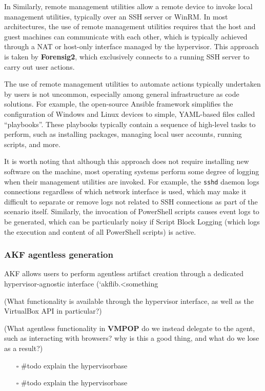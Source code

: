 In Similarly, remote management utilities allow a remote device to
invoke local management utilities, typically over an SSH server or
WinRM. In most architectures, the use of remote management utilities
requires that the host and guest machines can communicate with each
other, which is typically achieved through a NAT or host-only interface
managed by the hypervisor. This approach is taken by \textbf{Forensig2},
which exclusively connects to a running SSH server to carry out user
actions.

The use of remote management utilities to automate actions typically
undertaken by users is not uncommon, especially among general
infrastructure as code solutions. For example, the open-source Ansible
framework simplifies the configuration of Windows and Linux devices to
simple, YAML-based files called ``playbooks''. These playbooks typically
contain a sequence of high-level tasks to perform, such as installing
packages, managing local user accounts, running scripts, and more.

It is worth noting that although this approach does not require
installing new software on the machine, most operating systems perform
some degree of logging when their management utilities are invoked. For
example, the \texttt{sshd} daemon logs connections regardless of which
network interface is used, which may make it difficult to separate or
remove logs not related to SSH connections as part of the scenario
itself. Similarly, the invocation of PowerShell scripts causes event
logs to be generated, which can be particularly noisy if Script Block
Logging (which logs the execution and content of all PowerShell scripts)
is active.

\subsubsection{AKF agentless
generation}\label{akf-agentless-generation}

AKF allows users to perform agentless artifact creation through a
dedicated hypervisor-agnostic interface (`akflib.\textless something

(What functionality is available through the hypervisor interface, as
well as the VirtualBox API in particular?)

(What agentless functionality in \textbf{VMPOP} do we instead delegate
to the agent, such as interacting with browsers? why is this a good
thing, and what do we lose as a result?)

\begin{itemize}
\item[$\square$]
  \#todo explain the hypervisorbase
\item[$\square$]
  \#todo explain the hypervisorbase
\end{itemize}

